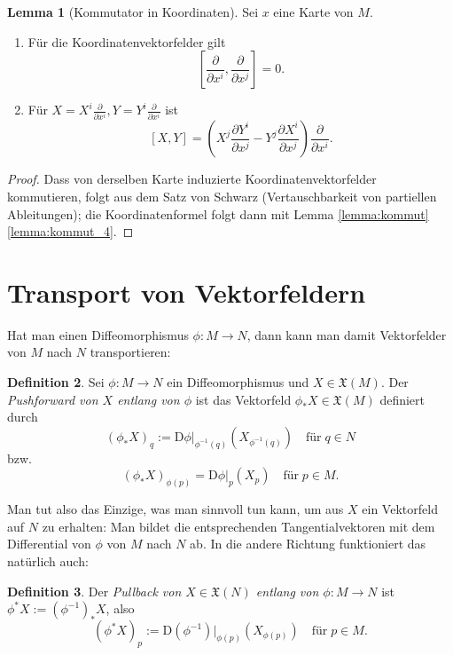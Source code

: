 \documentclass[a4paper]{scrreprt}
\numberwithin{equation}{chapter}
\newcommand{\DD}{\mathrm{D}}
\theoremstyle{definition}
\newtheorem{defn}{Definition}[section]
\newtheorem{lemma}[defn]{Lemma}
\begin{document}
\begin{lemma}[Kommutator in Koordinaten]
	Sei $x$ eine Karte von $M$.
	\begin{enumerate}[label=(\alph*)]
		\item Für die Koordinatenvektorfelder gilt
			\[\left[\frac{\partial}{\partial x^i}, \frac{\partial}{\partial x^j}\right] = 0.\]
		\item Für $X = X^i \frac{\partial}{\partial x^i}, Y = Y^i \frac{\partial}{\partial x^i}$ ist
			\[[X,Y] = \left(X^j\frac{\partial Y^i}{\partial x^j} - Y^j\frac{\partial X^i}{\partial x^j}\right) \frac{\partial}{\partial x^i}.\]
	\end{enumerate}

	\begin{proof}
		Dass von derselben Karte induzierte Koordinatenvektorfelder kommutieren, folgt aus dem Satz von Schwarz (Vertauschbarkeit von partiellen Ableitungen); die Koordinatenformel folgt dann mit Lemma \ref{lemma:kommut} \ref{lemma:kommut_4}.
	\end{proof}
\end{lemma}

\section{Transport von Vektorfeldern}
Hat man einen Diffeomorphismus $\phi\colon M\to N$, dann kann man damit Vektorfelder von $M$ nach $N$ \glqq transportieren\grqq:
\begin{defn}
	Sei $\phi\colon M \to N$ ein Diffeomorphismus und $X \in \mathfrak X(M)$. Der \emph{Pushforward von $X$ entlang von $\phi$} ist das Vektorfeld $\phi_*X \in \mathfrak X(M)$ definiert durch
	\[(\phi_*X)_q := \DD\phi|_{\phi^{-1}(q)}(X_{\phi^{-1}(q)}) \quad \text{für} \; q \in N\]
	bzw.
	\[(\phi_*X)_{\phi(p)} = \DD\phi|_{p}(X_p) \quad \text{für} \; p \in M.\]
\end{defn}
Man tut also das Einzige, was man sinnvoll tun kann, um aus $X$ ein Vektorfeld auf $N$ zu erhalten: Man bildet die entsprechenden Tangentialvektoren mit dem Differential von $\phi$ von $M$ nach $N$ ab. In die andere Richtung funktioniert das natürlich auch:
\begin{defn}
	Der \emph{Pullback von $X \in \mathfrak X(N)$ entlang von $\phi\colon M \to N$} ist $\phi^*X := (\phi^{-1})_*X$, also
	\[(\phi^*X)_p := \DD(\phi^{-1})|_{\phi(p)}(X_{\phi(p)}) \quad \text{für} \; p \in M.\]
\end{defn}
\end{document}
